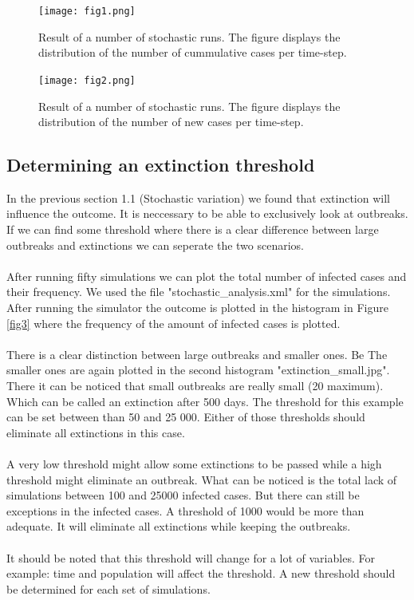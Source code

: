 \documentclass[runningheads]{llncs}
\begin{document}
	\begin{figure}
		\texttt{[image: fig1.png]}
		\caption{Result of a number of stochastic runs. The figure displays the distribution of the number of cummulative cases per time-step.} 	
		\label{fig1}
		
		\texttt{[image: fig2.png]}
		\caption{Result of a number of stochastic runs. The figure displays the distribution of the number of new cases per time-step.} 
		\label{fig2}
	\end{figure} 
	\newpage
	
	
	\subsection{Determining an extinction threshold}
	In the previous section 1.1 (Stochastic variation) we found that extinction will influence the outcome. It is neccessary to be able to exclusively look at outbreaks. If we can find some threshold where there is a clear difference between large outbreaks and extinctions we can seperate the two scenarios.\\ \\
	After running fifty simulations we can plot the total number of infected cases and their frequency.  We used the file "stochastic\_analysis.xml" for the simulations. After running the simulator the outcome is plotted in the histogram in Figure \ref{fig3} where the frequency of the amount of infected cases is plotted.\\ \\
	There is a clear distinction between large outbreaks and smaller ones. Be The smaller ones are again plotted in the second histogram "extinction\_small.jpg". There it can be noticed that small outbreaks are really small (20 maximum). Which can be called an extinction after 500 days. The threshold for this example can be set between than 50 and 25 000. Either of those thresholds should eliminate all extinctions in this case.\\ \\
	A very low threshold might allow some extinctions to be passed while a high threshold might eliminate an outbreak. What can be noticed is the total lack of simulations between 100 and 25000 infected cases. But there can still be exceptions in the infected cases. A threshold of 1000 would be more than adequate. It will eliminate all extinctions while keeping the outbreaks.\\ \\
	It should be noted that this threshold will change for a lot of variables. For example: time and population will affect the threshold. A new threshold should be determined for each set of simulations.
	
\end{document}
